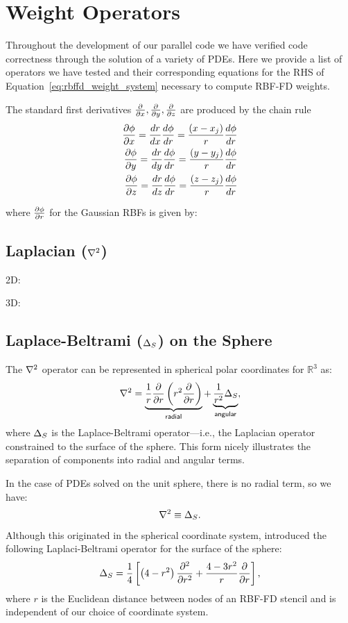 \documentclass{report}
\begin{document}
{\section{Weight Operators}
Throughout the development of our parallel code we have verified code correctness through the solution of a variety of PDEs. Here we provide a list of operators we have tested and their corresponding equations for the RHS of Equation~\ref{eq:rbffd_weight_system} necessary to compute RBF-FD weights. 

The standard first derivatives $\frac{\partial }{\partial x}, \frac{\partial }{\partial y}, \frac{\partial }{\partial z}$ are produced by the chain rule
	\begin{align} 
	 \frac{\partial \phi}{\partial x} = \frac{d r}{d x} \frac{d \phi}{d r} = \frac{(x-x_{j})}{r} \frac{d \phi}{d r} \\
	 \frac{\partial \phi}{\partial y} = \frac{d r}{d y} \frac{d \phi}{d r} = \frac{(y-y_{j})}{r} \frac{d \phi}{d r} \\
	 \frac{\partial \phi}{\partial z} = \frac{d r}{d z} \frac{d \phi}{d r} = \frac{(z-z_{j})}{r} \frac{d \phi}{d r}
	\end{align}

where $\frac{\partial \phi}{\partial r}$ for the Gaussian RBFs is given by: 


\subsection{Laplacian ($\Laplacian$)}

2D: 

3D: 

\subsection{Laplace-Beltrami ($\LaplaceBeltrami$) on the Sphere}

The $\Laplacian$ operator can be represented in spherical polar coordinates for $\mathbb{R}^3$ as: 
\begin{align} 
\nabla^2 = \underbrace{\frac{1}{r} \frac{\partial }{\partial r} \left( r^{2} \frac{\partial }{\partial r}  \right)}_{\mathsf{radial}} + \underbrace{\frac{1}{r^2} \Delta_{S}}_{\mathsf{angular}} , \label{eq:laplacian_in_spherical}
\end{align}
where $\LaplaceBeltrami$ is the Laplace-Beltrami operator---i.e., the Laplacian operator constrained to the surface of the sphere. This form nicely illustrates the separation of components into radial and angular terms. 

In the case of PDEs solved on the unit sphere, there is no radial term, so we have:
\begin{align}
\nabla^2 \equiv \Delta_S .
\end{align}
Although this originated in the spherical coordinate system, \cite{WrightFlyerYuen10} introduced the following Laplaci-Beltrami operator for the surface of the sphere: 
\begin{align} 
\Delta_S = \frac{1}{4} \left[ \left(4-r^2\right) \frac{\partial^2 }{\partial r^2} + \frac{4-3r^2}{r} \frac{\partial }{\partial r} \right],
\end{align} 
where $r$ is the Euclidean distance between nodes of an RBF-FD stencil and is independent of our choice of coordinate system. 

}
\end{document}
